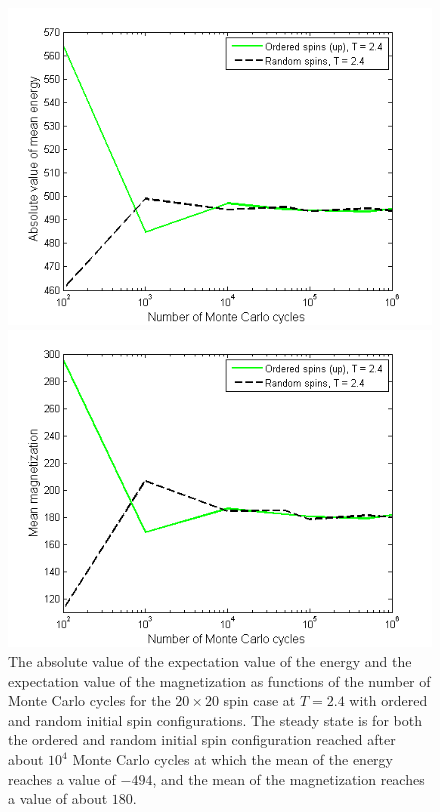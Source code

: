 \begin{figure}[H]
\centering
\begin{minipage}{.5\textwidth}
  \centering
  \includegraphics[width=1\linewidth]{Figures/Energy_2_4.png}
\end{minipage}%
\begin{minipage}{.5\textwidth}
  \centering
  \includegraphics[width=1\linewidth]{Figures/Magnetization_2_4.png}
\end{minipage}
\caption{
The absolute value of the expectation value of the energy and the expectation value of the magnetization as functions of the number of Monte Carlo cycles for the $20\times 20$ spin case at $T = 2.4$ with ordered and random initial spin configurations.
The steady state is for both the ordered and random initial spin configuration reached after about $10^4$ Monte Carlo cycles at which the mean of the energy reaches a value of $-494$, and the mean of the magnetization reaches a value of about $180$.
}
\label{fig:ResultsMCcyclesExpectationValue24}
\end{figure}

